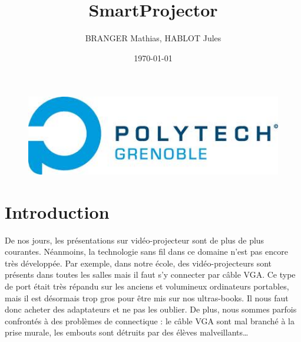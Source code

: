 \documentclass[a4paper, 11pt]{article}
\title{\Huge{SmartProjector}}
\author{BRANGER Mathias, HABLOT Jules}
\date{\today}
\begin{document}
\maketitle

\begin{figure}
	\centering
	\includegraphics[width=1\textwidth]{polytech.jpg}
\end{figure}

\clearpage

\tableofcontents

\clearpage



\section{Introduction}

De nos jours, les présentations sur vidéo-projecteur sont de plus de plus courantes. Néanmoins, la technologie sans fil dans ce domaine n'est pas encore très développée. Par exemple, dans notre école, des vidéo-projecteurs sont présents dans toutes les salles mais il faut s'y connecter par câble VGA. Ce type de port était très répandu sur les anciens et volumineux ordinateurs portables, mais il est désormais trop gros pour être mis sur nos ultras-books. Il nous faut donc acheter des adaptateurs et ne pas les oublier. De plus, nous sommes parfois confrontés à des problèmes de connectique : le câble VGA sont mal branché à la prise murale, les embouts sont détruits par des élèves malveillants…
\end{document}
